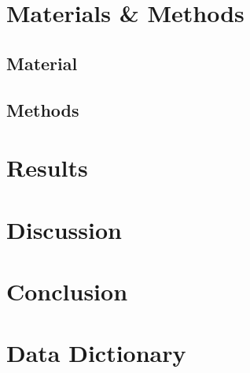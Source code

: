 \documentclass[]{article}
\begin{document}
\section{Materials \& Methods}
\subsection{Material}


\subsection{Methods}


\section{Results}


\section{Discussion}


\section{Conclusion}

%
%
%
% 
% 
%
%



\appendix

\section{Data Dictionary}
\label{appendix:data_dict}

\end{document}
